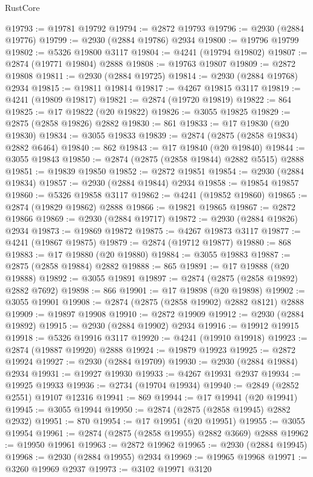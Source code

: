 \begin{lexlean}{RustCore}
\begin{coremodule}
@19793 := @19781 @19792
@19794 := @2872 @19793
@19796 := @2930 (@2884 @19776)
@19799 := @2930 (@2884 @19786) @2934
@19800 := @19796 @19799
@19802 := @5326 @19800 @3117
@19804 := @4241 (@19794 @19802)
@19807 := @2874 (@19771 @19804) @2888
@19808 := @19763 @19807
@19809 := @2872 @19808
@19811 := @2930 (@2884 @19725)
@19814 := @2930 (@2884 @19768) @2934
@19815 := @19811 @19814
@19817 := @4267 @19815 @3117
@19819 := @4241 (@19809 @19817)
@19821 := @2874 (@19720 @19819)
@19822 := 864
@19825 := @17 @19822 (@20 @19822)
@19826 := @3055 @19825
@19829 := @2875 (@2858 @19826) @2882
@19830 := 861
@19833 := @17 @19830 (@20 @19830)
@19834 := @3055 @19833
@19839 := @2874 (@2875 (@2858 @19834) @2882 @6464)
@19840 := 862
@19843 := @17 @19840 (@20 @19840)
@19844 := @3055 @19843
@19850 := @2874 (@2875 (@2858 @19844) @2882 @5515) @2888
@19851 := @19839 @19850
@19852 := @2872 @19851
@19854 := @2930 (@2884 @19834)
@19857 := @2930 (@2884 @19844) @2934
@19858 := @19854 @19857
@19860 := @5326 @19858 @3117
@19862 := @4241 (@19852 @19860)
@19865 := @2874 (@19829 @19862) @2888
@19866 := @19821 @19865
@19867 := @2872 @19866
@19869 := @2930 (@2884 @19717)
@19872 := @2930 (@2884 @19826) @2934
@19873 := @19869 @19872
@19875 := @4267 @19873 @3117
@19877 := @4241 (@19867 @19875)
@19879 := @2874 (@19712 @19877)
@19880 := 868
@19883 := @17 @19880 (@20 @19880)
@19884 := @3055 @19883
@19887 := @2875 (@2858 @19884) @2882
@19888 := 865
@19891 := @17 @19888 (@20 @19888)
@19892 := @3055 @19891
@19897 := @2874 (@2875 (@2858 @19892) @2882 @7692)
@19898 := 866
@19901 := @17 @19898 (@20 @19898)
@19902 := @3055 @19901
@19908 := @2874 (@2875 (@2858 @19902) @2882 @8121) @2888
@19909 := @19897 @19908
@19910 := @2872 @19909
@19912 := @2930 (@2884 @19892)
@19915 := @2930 (@2884 @19902) @2934
@19916 := @19912 @19915
@19918 := @5326 @19916 @3117
@19920 := @4241 (@19910 @19918)
@19923 := @2874 (@19887 @19920) @2888
@19924 := @19879 @19923
@19925 := @2872 @19924
@19927 := @2930 (@2884 @19709)
@19930 := @2930 (@2884 @19884) @2934
@19931 := @19927 @19930
@19933 := @4267 @19931 @2937
@19934 := @19925 @19933
@19936 := @2734 (@19704 @19934)
@19940 := @2849 (@2852 @2551) @19107 @12316
@19941 := 869
@19944 := @17 @19941 (@20 @19941)
@19945 := @3055 @19944
@19950 := @2874 (@2875 (@2858 @19945) @2882 @2932)
@19951 := 870
@19954 := @17 @19951 (@20 @19951)
@19955 := @3055 @19954
@19961 := @2874 (@2875 (@2858 @19955) @2882 @3669) @2888
@19962 := @19950 @19961
@19963 := @2872 @19962
@19965 := @2930 (@2884 @19945)
@19968 := @2930 (@2884 @19955) @2934
@19969 := @19965 @19968
@19971 := @3260 @19969 @2937
@19973 := @3102 @19971 @3120

\end{coremodule}
\end{lexlean}
